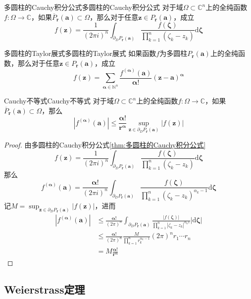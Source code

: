 \documentclass[lang = cn, scheme = chinese, thmcnt = section]{elegantbook}
\newcommand{\N}{\mathbb{N}}            %
\newcommand{\C}{\mathbb{C}}  		   %
\newcommand{\sub}{\subset}             %
\newcommand{\bs}{\boldsymbol}          %
\newcommand{\dd}{\mathrm{d}}           %
\begin{document}
\begin{theorem}{多圆柱的Cauchy积分公式}{多圆柱的Cauchy积分公式}
	对于域$\Omega\sub\C^n$上的全纯函数$f:\Omega\to\C$，如果$\overline{P}_{\bs{r}}(\bs{a})\sub\Omega$，那么对于任意$\bs{z}\in P_{\bs{r}}(\bs{a})$，成立
	$$
	f(\bs{z})=
	\frac{1}{(2\pi i)^n}\int_{\partial_DP_{\bs{r}}(\bs{a})}\frac{f(\bs{\zeta})}{\prod\limits_{k=1}^{n}(\zeta_k-z_k)}\dd\bs{\zeta}
	$$
\end{theorem}

\begin{theorem}{多圆柱的Taylor展式}{多圆柱的Taylor展式}
	如果函数$f$为多圆柱$P_{\bs{r}}(\bs{a})$上的全纯函数，那么对于任意$\bs{z}\in P_{\bs{r}}(\bs{a})$，成立
	$$
	f(\bs{z})
	=\sum_{\bs{\alpha}\in\N^n}\frac{f^{(\bs{\alpha})}(\bs{a})}{\bs{\alpha}!}(\bs{z}-\bs{a})^{\bs{\alpha}}
	$$
\end{theorem}

\begin{theorem}{Cauchy不等式}{Cauchy不等式}
	对于域$\Omega\sub\C^n$上的全纯函数$f:\Omega\to\C$，如果$\overline{P}_{\bs{r}}(\bs{a})\sub\Omega$，那么
	$$
	\left|f^{(\bs{\alpha})}(\bs{a})\right|
	\le
	\frac{\bs{\alpha}!}{\bs{r}^{\bs{\alpha}}}\sup_{\bs{z}\in \partial_DP_{\bs{r}}(\bs{a})}|f(\bs{z})|
	$$
\end{theorem}

\begin{proof}
	由多圆柱的Cauchy积分公式\ref{thm:多圆柱的Cauchy积分公式}
	$$
	f(\bs{z})=
	\frac{1}{(2\pi i)^n}\int_{\partial_DP_{\bs{r}}(\bs{a})}\frac{f(\bs{\zeta})}{\prod\limits_{k=1}^{n}(\zeta_k-z_k)}\dd\bs{\zeta}
	$$
	那么
	$$
	f^{(\bs{\alpha})}(\bs{a})=\frac{\bs{\alpha}!}{(2\pi i )^n}
	\int_{\partial_DP_{\bs{r}}(\bs{a})}
	\frac{f(\bs{\zeta})}{\prod\limits_{k=1}^{n}(\zeta_k-z_k)^{\alpha_k-1}}\dd\bs{\zeta}
	$$
	记$\displaystyle M=\sup_{\bs{z}\in \partial_DP_{\bs{r}}(\bs{a})}|f(\bs{z})|$，进而
	\begin{align*}
		\left|f^{(\bs{\alpha})}(\bs{a})\right|
		& \le \frac{\bs{\alpha}!}{(2\pi)^n}
		\int_{\partial_DP_{\bs{r}}(\bs{a})}
		\frac{|f(\bs{\zeta})|}{\prod\limits_{k=1}^{n}|\zeta_k-z_k|^{\alpha_k1}}|\dd\bs{\zeta}|\\
		& \le \frac{\bs{\alpha}!}{(2\pi)^n}
		\frac{M}{\prod\limits_{k=1}^{n}r_k^{\alpha_k-1}}(2\pi)^nr_1\cdots r_n\\
		& = M\frac{\bs{\alpha}!}{\bs{r}^{\bs{\alpha}}}
	\end{align*}
\end{proof}

\subsection{Weierstrass定理}
\end{document}
